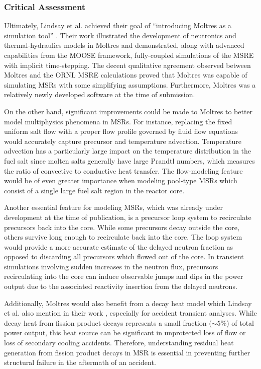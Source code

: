 \subsubsection{Critical Assessment} \label{sec:msre-critique}

Ultimately, Lindsay et al. achieved their goal of ``introducing Moltres as a
simulation tool'' \cite{lindsay_introduction_2018}. Their work illustrated the
development of neutronics and thermal-hydraulics models in Moltres and
demonstrated, along with advanced capabilities from the \gls{MOOSE} framework,
fully-coupled simulations of the \gls{MSRE} with implicit time-stepping. The
decent qualitative agreement observed between Moltres and the \gls{ORNL}
\gls{MSRE} calculations proved that Moltres was capable of simulating
\glspl{MSR} with some simplifying assumptions. Furthermore, Moltres was a
relatively newly developed software at the time of submission.

On the other hand, significant improvements could be made to Moltres to better
model multiphysics phenomena in \glspl{MSR}. For instance, replacing the
fixed uniform salt flow with a proper flow profile governed by fluid flow
equations would accurately capture precursor and temperature advection.
Temperature advection has a particularly large impact on the temperature
distribution in the fuel salt since molten salts generally have large Prandtl
numbers, which measures the ratio of convective to conductive heat transfer.
The flow-modeling feature would be of even greater importance when modeling
pool-type \glspl{MSR} which consist of a single large fuel salt region in the
reactor core.

Another essential feature for modeling \glspl{MSR}, which was already under
development at the time of publication, is a precursor loop
system to recirculate precursors back into the core. While some precursors
decay outside the core, others survive long enough to recirculate back into the
core. The loop system would provide a more accurate estimate of the delayed
neutron fraction as opposed to discarding all precursors which flowed out of
the core. In transient simulations involving sudden increases in the neutron
flux, precursors recirculating into the core can induce observable jumps and
dips in the power output due to the associated reactivity insertion from the
delayed neutrons.

Additionally, Moltres would also benefit from a decay heat model which Lindsay
et al. also mention in their work \cite{lindsay_introduction_2018}, especially
for accident transient analyses. While decay heat from fission product decays
represents a small fraction ($\sim5\%$) of total power output, this heat source
can be significant in unprotected loss of flow or loss of secondary cooling
accidents. Therefore, understanding residual heat generation from fission
product decays in \gls{MSR} is essential in preventing further structural
failure in the aftermath of an accident.

